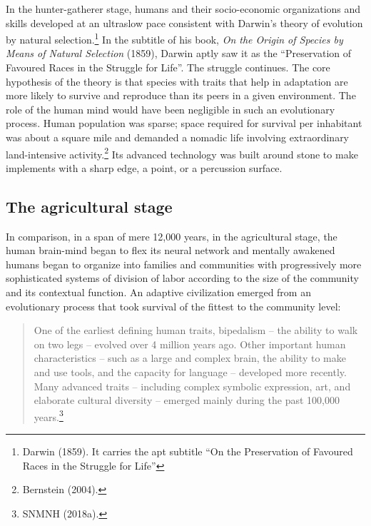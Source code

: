 \begin{multicols}{2}
In the hunter-gatherer stage, humans and their socio-economic organizations and skills developed at an ultraslow pace consistent with Darwin's theory of evolution by natural selection.\footnote{Darwin (1859). It carries the apt subtitle “On the Preservation of Favoured Races in the Struggle for Life”} In the subtitle of his book, \textit{On the Origin of Species by Means of Natural Selection} (1859), Darwin aptly saw it as the “Preservation of Favoured Races in the Struggle for Life”. The struggle continues. The core hypothesis of the theory is that species with traits that help in adaptation are more likely to survive and reproduce than its peers in a given environment. The role of the human mind would have been negligible in such an evolutionary process. Human population was sparse; space required for survival per inhabitant was about a square mile and demanded a nomadic life involving extraordinary land-intensive activity.\footnote{Bernstein (2004).} Its advanced technology was built around stone to make implements with a sharp edge, a point, or a percussion surface.\\[-15pt]

\subsection{The agricultural stage}

In comparison, in a span of mere 12,000 years, in the agricultural stage, the human brain-mind began to flex its neural network and mentally awakened humans began to organize into families and communities with progressively more sophisticated systems of division of labor according to the size of the community and its contextual function. An adaptive civilization emerged from an evolutionary process that took survival of the fittest to the community level:
\begin{quote}
One of the earliest defining human traits, bipedalism – the ability to walk on two legs – evolved over 4 million years ago. Other important human characteristics – such as a large and complex brain, the ability to make and use tools, and the capacity for language – developed more recently. Many advanced traits – including complex symbolic expression, art, and elaborate cultural diversity – emerged mainly during the past 100,000 years.\footnote{SNMNH (2018a).}
\end{quote}


\end{multicols}
